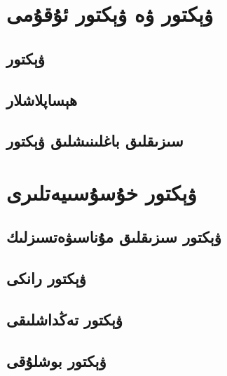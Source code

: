
\section{ۋېكتور ۋە ۋېكتور ئۇقۇمى}
\subsection{ۋېكتور}
\subsection{ھېساپلاشلار}
\subsection{سىزىقلىق باغلىنىشلىق ۋېكتور}

\section{ۋېكتور خۇسۇسىيەتلىرى}
\subsection{ۋېكتور سىزىقلىق مۇناسىۋەتسىزلىك}
\subsection{ۋېكتور رانكى}
\subsection{ۋېكتور تەڭداشلىقى}
\subsection{ۋېكتور بوشلۇقى}
